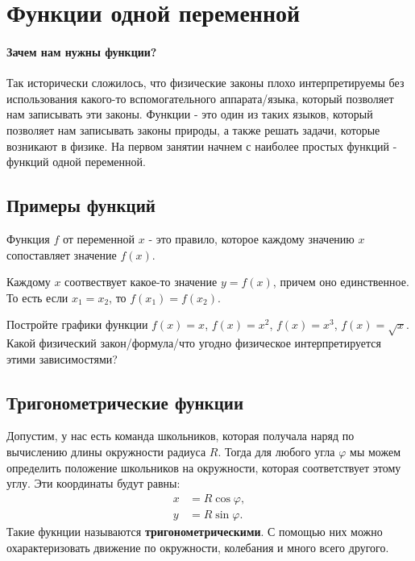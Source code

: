 \section{Функции одной переменной}
\paragraph{Зачем нам нужны функции?} Так исторически сложилось, что физические законы плохо интерпретируемы без использования какого-то вспомогательного аппарата/языка, который 
позволяет нам записывать эти законы. Функции - это один из таких языков, который позволяет нам записывать законы природы, а также решать задачи, которые возникают в физике. На первом занятии начнем с наиболее простых функций - функций одной переменной.
\subsection{Примеры функций}
\begin{definition}
    Функция $f$ от переменной $x$ - это правило, которое каждому значению $x$ сопоставляет значение $f(x)$.
\end{definition}
Каждому $x$ соотвествует какое-то значение $y = f(x)$, причем оно единственное. То есть если $x_1 = x_2$, то $f(x_1) = f(x_2)$.

\begin{prac}
   Постройте графики функции $f(x) = x$, $f(x) = x^2$, $f(x) = x^3$, $f(x) = \sqrt{x}$. Какой физический закон/формула/что угодно физическое интерпретируется этими зависимостями? 
\end{prac}
\subsection{Тригонометрические функции}
Допустим, у нас есть команда школьников, которая получала наряд по вычислению длины окружности радиуса $R$. Тогда для любого угла $\varphi$ мы можем определить положение школьников на окружности, которая соответствует этому углу. Эти координаты будут равны:
\begin{align*}
    x &= R \cos \varphi, \\
    y &= R \sin \varphi.
\end{align*}
Такие фукнции называются \textbf{тригонометрическими}. С помощью них можно охарактеризовать движение по окружности, колебания и много всего другого.

